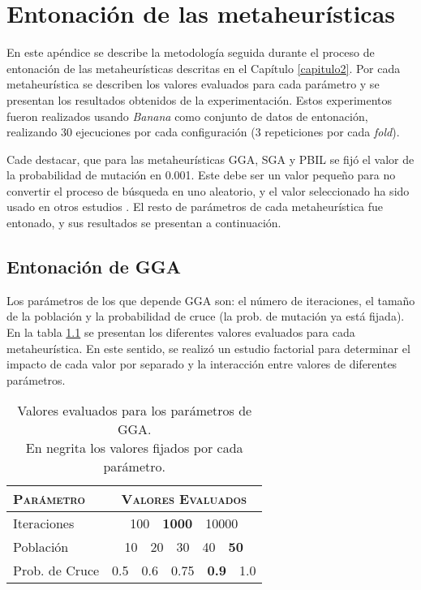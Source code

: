 \chapter{Entonación de las metaheurísticas}
\label{apendiceA}

En este apéndice se describe la metodología seguida durante el proceso de entonación de las metaheurísticas descritas en el Capítulo \ref{capitulo2}. Por cada metaheurística se describen los valores evaluados para cada parámetro y se presentan los resultados obtenidos de la experimentación. Estos experimentos fueron realizados usando \emph{Banana} como conjunto de datos de entonación, realizando 30 ejecuciones por cada configuración (3 repeticiones por cada \emph{fold}).

Cade destacar, que para las metaheurísticas GGA, SGA y PBIL se fijó el valor de la probabilidad de mutación en 0.001. Este debe ser un valor pequeño para no convertir el proceso de búsqueda en uno aleatorio, y el valor seleccionado ha sido usado en otros estudios \cite{cano2003using}. El resto de parámetros de cada metaheurística fue entonado, y sus resultados se presentan a continuación.

\section{Entonación de GGA}

Los parámetros de los que depende GGA son: el número de iteraciones, el tamaño de la población y la probabilidad de cruce (la prob. de mutación ya está fijada). En la tabla \ref{table-ap-gga} se presentan los diferentes valores evaluados para cada metaheurística. En este sentido, se realizó un estudio factorial para determinar el impacto de cada valor por separado y la interacción entre valores de diferentes parámetros.

\begin{table}[h!]
\centering
\begin{tabular}{l c}
\hline
\textsc{Parámetro} & \textsc{Valores Evaluados} \\
\hline
\hline
Iteraciones & 100\ \ \textbf{1000}\ \ 10000 \\
Población   & 10\ \ 20\ \ 30\ \ 40\ \ \textbf{50} \\
Prob. de Cruce & 0.5\ \ 0.6\ \ 0.75\ \ \textbf{0.9}\ \ 1.0\\
\hline
\end{tabular}
\caption[Valores evaluados para los parámetros de GGA]{Valores evaluados para los parámetros de GGA.\\En negrita los valores fijados por cada parámetro.}
\label{table-ap-gga}
\end{table}

